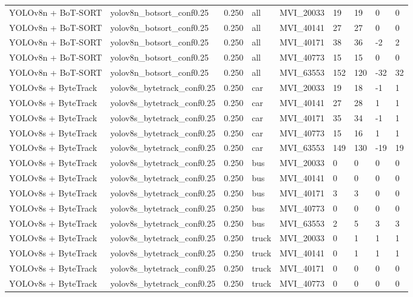 \begin{tabular}{lllllllll}
YOLOv8n + BoT-SORT & yolov8n\_botsort\_conf0.25 & 0.250 & all & MVI\_20033 & 19 & 19 & 0 & 0 \\
YOLOv8n + BoT-SORT & yolov8n\_botsort\_conf0.25 & 0.250 & all & MVI\_40141 & 27 & 27 & 0 & 0 \\
YOLOv8n + BoT-SORT & yolov8n\_botsort\_conf0.25 & 0.250 & all & MVI\_40171 & 38 & 36 & -2 & 2 \\
YOLOv8n + BoT-SORT & yolov8n\_botsort\_conf0.25 & 0.250 & all & MVI\_40773 & 15 & 15 & 0 & 0 \\
YOLOv8n + BoT-SORT & yolov8n\_botsort\_conf0.25 & 0.250 & all & MVI\_63553 & 152 & 120 & -32 & 32 \\
YOLOv8s + ByteTrack & yolov8s\_bytetrack\_conf0.25 & 0.250 & car & MVI\_20033 & 19 & 18 & -1 & 1 \\
YOLOv8s + ByteTrack & yolov8s\_bytetrack\_conf0.25 & 0.250 & car & MVI\_40141 & 27 & 28 & 1 & 1 \\
YOLOv8s + ByteTrack & yolov8s\_bytetrack\_conf0.25 & 0.250 & car & MVI\_40171 & 35 & 34 & -1 & 1 \\
YOLOv8s + ByteTrack & yolov8s\_bytetrack\_conf0.25 & 0.250 & car & MVI\_40773 & 15 & 16 & 1 & 1 \\
YOLOv8s + ByteTrack & yolov8s\_bytetrack\_conf0.25 & 0.250 & car & MVI\_63553 & 149 & 130 & -19 & 19 \\
YOLOv8s + ByteTrack & yolov8s\_bytetrack\_conf0.25 & 0.250 & bus & MVI\_20033 & 0 & 0 & 0 & 0 \\
YOLOv8s + ByteTrack & yolov8s\_bytetrack\_conf0.25 & 0.250 & bus & MVI\_40141 & 0 & 0 & 0 & 0 \\
YOLOv8s + ByteTrack & yolov8s\_bytetrack\_conf0.25 & 0.250 & bus & MVI\_40171 & 3 & 3 & 0 & 0 \\
YOLOv8s + ByteTrack & yolov8s\_bytetrack\_conf0.25 & 0.250 & bus & MVI\_40773 & 0 & 0 & 0 & 0 \\
YOLOv8s + ByteTrack & yolov8s\_bytetrack\_conf0.25 & 0.250 & bus & MVI\_63553 & 2 & 5 & 3 & 3 \\
YOLOv8s + ByteTrack & yolov8s\_bytetrack\_conf0.25 & 0.250 & truck & MVI\_20033 & 0 & 1 & 1 & 1 \\
YOLOv8s + ByteTrack & yolov8s\_bytetrack\_conf0.25 & 0.250 & truck & MVI\_40141 & 0 & 1 & 1 & 1 \\
YOLOv8s + ByteTrack & yolov8s\_bytetrack\_conf0.25 & 0.250 & truck & MVI\_40171 & 0 & 0 & 0 & 0 \\
YOLOv8s + ByteTrack & yolov8s\_bytetrack\_conf0.25 & 0.250 & truck & MVI\_40773 & 0 & 0 & 0 & 0 \\

\end{tabular}
